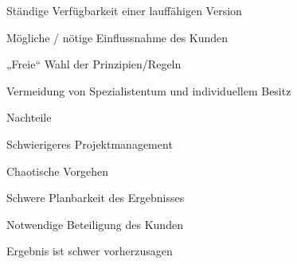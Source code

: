 \documentclass[a4paper]{article}
\begin{document}
\begin{multicols}{3}
\begin{itemize*}
\begin{itemize*}
            \item Ständige Verfügbarkeit einer lauffähigen Version
            \item Mögliche / nötige Einflussnahme des Kunden
            \item „Freie“ Wahl der Prinzipien/Regeln
            \item Vermeidung von Spezialistentum und individuellem Besitz
          \end{itemize*}
    \item Nachteile
          \begin{itemize*}
            \item Schwierigeres Projektmanagement
                  \begin{itemize*}
                    \item Chaotische Vorgehen
                    \item Schwere Planbarkeit des Ergebnisses
                  \end{itemize*}
            \item Notwendige Beteiligung des Kunden
            \item Ergebnis ist schwer vorherzusagen
          \end{itemize*}
  \end{itemize*}


\end{multicols}
\end{document}
